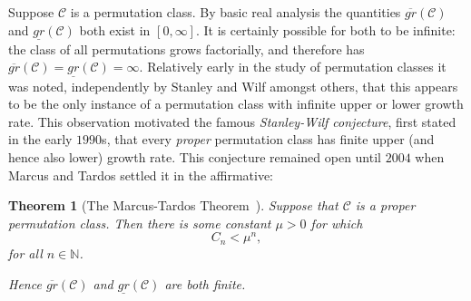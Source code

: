 \documentclass[11pt,a4paper]{article}
\newtheorem{thm}{Theorem}[section]
\theoremstyle{definition}
\newtheorem{comment}[thm]{Comment}
\begin{document}

Suppose $\mathcal{C}$ is a permutation class. By basic real analysis the quantities $\overline{gr}(\mathcal{C})$ and $\underline{gr}(\mathcal{C})$ both exist in $[0,\infty]$. It is certainly possible for both to be infinite: the class of all permutations grows factorially, and therefore has $\overline{gr}(\mathcal{C}) = \underline{gr}(\mathcal{C}) = \infty$. Relatively early in the study of permutation classes it was noted, independently by Stanley and Wilf amongst others, that this appears to be the only instance of a permutation class with infinite upper or lower growth rate. This observation motivated the famous \emph{Stanley-Wilf conjecture}, first stated in the early $1990$s, that every \emph{proper} permutation class has finite upper (and hence also lower) growth rate. This conjecture remained open until $2004$ when Marcus and Tardos settled it in the affirmative:

\begin{thm}[The Marcus-Tardos Theorem~\cite{marcus:excluded-permut:}]
Suppose that $\mathcal{C}$ is a proper permutation class. Then there is some constant $\mu > 0$ for which
\[
C_{n} < \mu^{n},
\]
for all $n \in \mathbb{N}$.

Hence $\overline{gr}(\mathcal{C})$ and $\underline{gr}(\mathcal{C})$ are both finite.
\end{thm}
\end{document}
